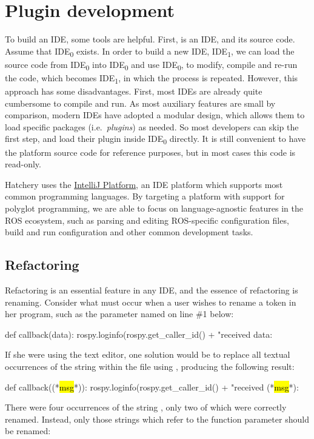 \section{Plugin development}

To build an IDE, some tools are helpful. First, is an IDE, and its source code. Assume that IDE\textsubscript{0} exists. In order to build a new IDE, IDE\textsubscript{1}, we can load the source code from IDE\textsubscript{0} into IDE\textsubscript{0} and use IDE\textsubscript{0}, to modify, compile and re-run the code, which becomes IDE\textsubscript{1}, in which the process is repeated. However, this approach has some disadvantages. First, most IDEs are already quite cumbersome to compile and run. As most auxiliary features are small by comparison, modern IDEs have adopted a modular design, which allows them to load specific packages (i.e.\ \textit{plugins}) as needed. So most developers can skip the first step, and load their plugin inside IDE\textsubscript{0} directly. It is still convenient to have the platform source code for reference purposes, but in most cases this code is read-only.

Hatchery uses the \href{https://www.jetbrains.org/intellij/sdk/docs/}{IntelliJ Platform}, an IDE platform which supports most common programming languages. By targeting a platform with support for polyglot programming, we are able to focus on language-agnostic features in the ROS ecosystem, such as parsing and editing ROS-specific configuration files, build and run configuration and other common development tasks.

\subsection{Refactoring}\label{subsec:refactoring}

Refactoring is an essential feature in any IDE, and the essence of refactoring is renaming. Consider what must occur when a user wishes to rename a token in her program, such as the parameter named  on line \#1 below:
%
\begin{pythonlisting}
def callback(data):
    rospy.loginfo(rospy.get_caller_id() + "received data: %
\end{pythonlisting}
%
If she were using the  text editor, one solution would be to replace all textual occurrences of the string  within the file using , producing the following result:
%
\begin{pythonlisting}
def callback((*\hl{msg}*)):
    rospy.loginfo(rospy.get_caller_id() + "received (*\hl{msg}*): %
\end{pythonlisting}
%
There were four occurrences of the string , only two of which were correctly renamed. Instead, only those strings which refer to the function parameter should be renamed:
%
\newcommand{\cfbox}[2]{\colorlet{currentcolor}{.}{\color{#1}\fbox{\color{currentcolor}#2}}}

